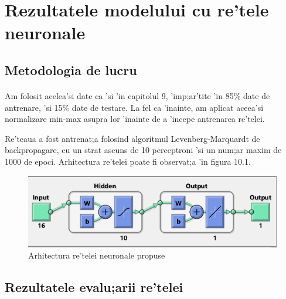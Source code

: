 \section{Rezultatele modelului cu re'tele neuronale}

\subsection{Metodologia de lucru}
\paragraph{}
Am folosit acelea'si date ca 'si 'in capitolul 9, 'imp;ar'tite 'in 85\% date de antrenare, 'si 15\% date de testare. La fel ca 'inainte, am aplicat aceea'si normalizare min-max asupra lor 'inainte de a 'incepe antrenarea re'telei.
\par
Re'teaua a fost antrenat;a folosind algoritmul Levenberg-Marquardt de backpropagare, cu un strat ascuns de 10 perceptroni 'si un num;ar maxim de 1000 de epoci. Arhitectura re'telei poate fi observat;a 'in figura 10.1.
\begin{figure}[!htbp]
\includegraphics[width=\textwidth]{nnarch}
\caption {Arhitectura re'telei neuronale propuse}
\end{figure}
\subsection{Rezultatele evalu;arii re'telei}
